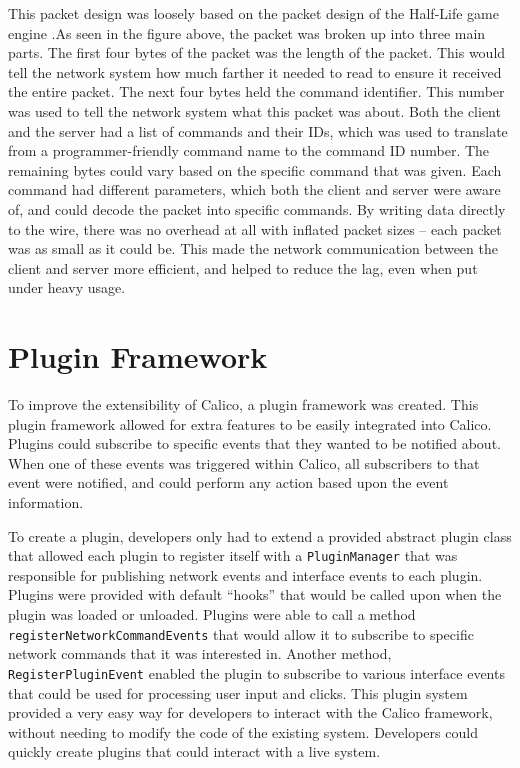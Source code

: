 This packet design was loosely based on the packet design of the Half-Life game engine \cite{rcon}.As seen in the figure above, the packet was broken up into three main parts. The first four bytes of the packet was the length of the packet. This would tell the network system how much farther it needed to read to ensure it received the entire packet. The next four bytes held the command identifier. This number was used to tell the network system what this packet was about. Both the client and the server had a list of commands and their IDs, which was used to translate from a programmer-friendly command name to the command ID number. The remaining bytes could vary based on the specific command that was given. Each command had different parameters, which both the client and server were aware of, and could decode the packet into specific commands. By writing data directly to the wire, there was no overhead at all with inflated packet sizes -- each packet was as small as it could be. This made the network communication between the client and server more efficient, and helped to reduce the lag, even when put under heavy usage.

\section{Plugin Framework}
To improve the extensibility of Calico, a plugin framework was created. This plugin framework allowed for extra features to be easily integrated into Calico. Plugins could subscribe to specific events that they wanted to be notified about. When one of these events was triggered within Calico, all subscribers to that event were notified, and could perform any action based upon the event information. 

To create a plugin, developers only had to extend a provided abstract plugin class that allowed each plugin to register itself with a \texttt{PluginManager} that was responsible for publishing network events and interface events to each plugin. Plugins were provided with default ``hooks'' that would be called upon when the plugin was loaded or unloaded. Plugins were able to call a method \texttt{registerNetworkCommandEvents} that would allow it to subscribe to specific network commands that it was interested in. Another method, \texttt{RegisterPluginEvent} enabled the plugin to subscribe to various interface events that could be used for processing user input and clicks. This plugin system provided a very easy way for developers to interact with the Calico framework, without needing to modify the code of the existing system. Developers could quickly create plugins that could interact with a live system.


